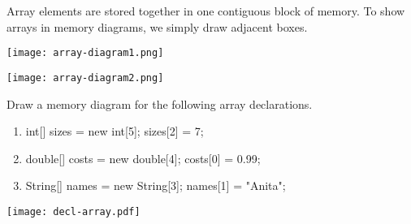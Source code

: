 
Array elements are stored together in one contiguous block of memory.
To show arrays in memory diagrams, we simply draw adjacent boxes.

\begin{multicols}{2}

\begin{center}

\vspace{1ex}
\texttt{[image: array-diagram1.png]}
\end{center}

\columnbreak

\begin{center}

\vspace{1ex}
\texttt{[image: array-diagram2.png]}
\end{center}

\end{multicols}




\Q Draw a memory diagram for the following array declarations.

\begin{minipage}{0.46\linewidth}

\begin{enumerate}

\item
\begin{javalst}
int[] sizes = new int[5];
sizes[2] = 7;
\end{javalst}

\item
\begin{javalst}
double[] costs = new double[4];
costs[0] = 0.99;
\end{javalst}

\item
\begin{javalst}
String[] names = new String[3];
names[1] = "Anita";
\end{javalst}

\end{enumerate}

\end{minipage}
\hfill
\begin{minipage}{0.53\linewidth}

\begin{answer}[130pt]
\texttt{[image: decl-array.pdf]}
\end{answer}

\end{minipage}


